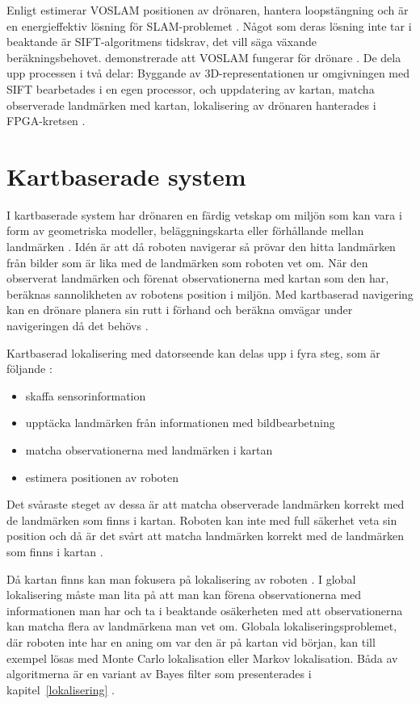 Enligt \cite{voslam} estimerar VOSLAM positionen av drönaren, hantera loopstängning och är en energieffektiv lösning för SLAM-problemet \citep{voslam}. Något som deras lösning inte tar i beaktande är SIFT-algoritmens tidskrav, det vill säga växande beräkningsbehovet. \cite{voslamlatif} demonstrerade att VOSLAM fungerar för drönare \citep{voslamlatif}. De dela upp processen i två delar: Byggande av 3D-representationen ur omgivningen med SIFT bearbetades i en egen processor, och uppdatering av kartan, matcha observerade landmärken med kartan, lokalisering av drönaren hanterades i FPGA-kretsen \citep{voslamlatif}.

\section{Kartbaserade system}

I kartbaserade system har drönaren en färdig vetskap om miljön som kan vara i form av geometriska modeller, beläggningskarta eller förhållande mellan landmärken \citep{982903}. Idén är att då roboten navigerar så prövar den hitta landmärken från bilder som är lika med de landmärken som roboten vet om. När den observerat landmärken och förenat observationerna med kartan som den har, beräknas sannolikheten av robotens position i miljön. Med kartbaserad navigering kan en drönare planera sin rutt i förhand och beräkna omvägar under navigeringen då det behövs \citep{geospatial}. 

Kartbaserad lokalisering med datorseende kan delas upp i fyra steg, som är följande \citep{982903}:

\begin{itemize}
    \item skaffa sensorinformation
    \item upptäcka landmärken från informationen med bildbearbetning
    \item matcha observationerna med landmärken i kartan
    \item estimera positionen av roboten
\end{itemize}

Det svåraste steget av dessa är att matcha observerade landmärken korrekt med de landmärken som finns i kartan. Roboten kan inte med full säkerhet veta sin position och då är det svårt att matcha landmärken korrekt med de landmärken som finns i kartan \citep{982903}.

Då kartan finns kan man fokusera på lokalisering av roboten \citep{982903}. I global lokalisering måste man lita på att man kan förena observationerna med informationen man har och ta i beaktande osäkerheten med att observationerna kan matcha flera av landmärkena man vet om. Globala lokaliseringsproblemet, där roboten inte har en aning om var den är på kartan vid början, kan till exempel lösas med Monte Carlo lokalisation eller Markov lokalisation. Båda av algoritmerna är en variant av Bayes filter som presenterades i kapitel~\ref{lokalisering} \citep{ProbabilisticRobotics}. 

